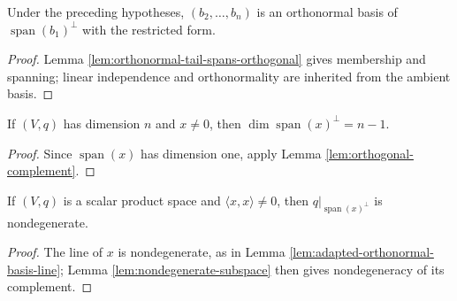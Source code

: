 \begin{lemma}
\label{lem:orthonormal-basis-orthogonal-complement}





Under the preceding hypotheses, $(b_2,\ldots,b_n)$ is an orthonormal basis of $\operatorname{span}(b_1)^\perp$ with the restricted form.
\end{lemma}
\begin{proof}

\sketch Lemma \ref{lem:orthonormal-tail-spans-orthogonal} gives membership and spanning; linear independence and orthonormality are inherited from the ambient basis.
\end{proof}

\begin{lemma}
\label{lem:orthogonal-complement-non-null-line-hyperplane}





If $(V,q)$ has dimension $n$ and $x\ne0$, then $\dim\operatorname{span}(x)^\perp=n-1$.
\end{lemma}
\begin{proof}

\sketch Since $\operatorname{span}(x)$ has dimension one, apply Lemma \ref{lem:orthogonal-complement}.
\end{proof}

\begin{lemma}
\label{lem:orthogonal-complement-non-null-line-nondegenerate}





If $(V,q)$ is a scalar product space and $\langle x,x\rangle\ne0$, then $q|_{\operatorname{span}(x)^\perp}$ is nondegenerate.
\end{lemma}
\begin{proof}

\sketch The line of $x$ is nondegenerate, as in Lemma \ref{lem:adapted-orthonormal-basis-line}; Lemma \ref{lem:nondegenerate-subspace} then gives nondegeneracy of its complement.
\end{proof}

